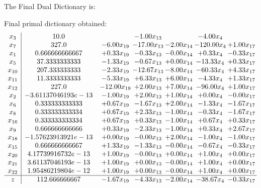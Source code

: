 \documentclass[8pt]{article}
\begin{document}
The Final Dual Dictionary is: 

 Final primal dictionary obtained: 
\[\begin{array}{c| c c@{\hskip 2pt} c@{\hskip 2pt} c@{\hskip 2pt} c@{\hskip 2pt} c@{\hskip 2pt} }
 x_{3}   &  10.0  &   & -1.00 x_{13} &   & -4.00 x_{4} &   \\
 x_{7}   &  327.0 & -6.00 x_{19} & -17.00 x_{13} & -2.00 x_{14} & -120.00 x_{4} & +  1.00 x_{17}\\
 x_{1}   &  0.666666666667 & +  0.33 x_{19} & -0.33 x_{13} & -0.00 x_{14} & +  0.33 x_{4} & -0.33 x_{17}\\
 x_{5}   &  37.3333333333 & -1.33 x_{19} & -0.67 x_{13} & +  0.00 x_{14} & -13.33 x_{4} & +  0.33 x_{17}\\
 x_{10}   &  207.333333333 & -2.33 x_{19} & -12.67 x_{13} & -8.00 x_{14} & -60.33 x_{4} & +  4.33 x_{17}\\
 x_{11}   &  11.3333333333 & -5.33 x_{19} & +  6.33 x_{13} & +  6.00 x_{14} & -4.33 x_{4} & +  1.33 x_{17}\\
 x_{12}   &  227.0 & -12.00 x_{19} & +  2.00 x_{13} & +  7.00 x_{14} & -96.00 x_{4} & +  1.00 x_{17}\\
 x_{2}   &  -3.61137046193e-13 & -1.00 x_{19} & +  2.00 x_{13} & +  1.00 x_{14} & +  0.00 x_{4} & -0.00 x_{17}\\
 x_{6}   &  0.333333333333 & +  0.67 x_{19} & -1.67 x_{13} & +  2.00 x_{14} & -1.33 x_{4} & -1.67 x_{17}\\
 x_{8}   &  0.333333333334 & +  0.67 x_{19} & +  2.33 x_{13} & -1.00 x_{14} & -0.33 x_{4} & -1.67 x_{17}\\
 x_{16}   &  0.333333333334 & +  0.67 x_{19} & +  0.33 x_{13} & -1.00 x_{14} & +  0.67 x_{4} & +  0.33 x_{17}\\
 x_{9}   &  0.666666666666 & +  0.33 x_{19} & -2.33 x_{13} & -1.00 x_{14} & +  0.33 x_{4} & +  2.67 x_{17}\\
 x_{18}   &  -1.57623913921e-13 & +  0.00 x_{19} & -0.00 x_{13} & +  2.00 x_{14} & -1.00 x_{4} & -1.00 x_{17}\\
 x_{15}   &  0.666666666667 & +  1.33 x_{19} & -1.33 x_{13} & -0.00 x_{14} & -0.67 x_{4} & -0.33 x_{17}\\
 x_{20}   &  4.17739916732e-13 & +  1.00 x_{19} & -0.00 x_{13} & +  0.00 x_{14} & +  1.00 x_{4} & +  0.00 x_{17}\\
 x_{21}   &  3.61137046193e-13 & +  1.00 x_{19} & +  0.00 x_{13} & -0.00 x_{14} & +  1.00 x_{4} & +  0.00 x_{17}\\
 x_{22}   &  1.95486219804e-12 & +  1.00 x_{19} & +  0.00 x_{13} & -0.00 x_{14} & +  1.00 x_{4} & +  0.00 x_{17}\\
\hline
z    &  112.666666667 & -1.67 x_{19} & -4.33 x_{13} & -2.00 x_{14} & -38.67 x_{4} & -0.33 x_{17}\\
\end{array}\]
\end{document}
